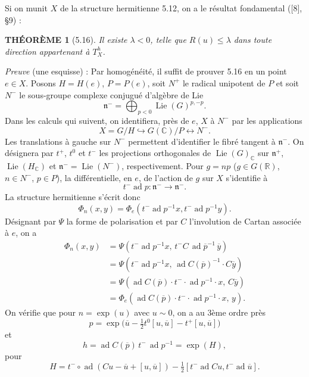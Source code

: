 \documentclass[10pt]{article}
\newcommand{\C}{\mathbb C}
\newcommand{\R}{\mathbb R}
\theoremstyle{deligne}
\newtheorem*{theoreme}{THÉORÈME}
\newcommand{\Lie}{\operatorname{Lie}}
\newcommand{\ad}{\operatorname{ad}}
\begin{document}
Si on munit $X$ de la structure hermitienne 5.12, on a le résultat fondamental ([8], §9) :

\begin{theoreme}[5.16]
Il existe $\lambda<0$, telle que $R(u)\le\lambda$ dans toute direction appartenant à $T_X^h$.
\end{theoreme}

\emph{Preuve} (une esquisse) : Par homogénéité, il suffit de prouver 5.16 en un point $e\in X$. Posons $H=H(e)$, $P=P(e)$, soit $N^+$ le radical unipotent de $P$ et soit $N^-$ le sous-groupe complexe conjugué d'algèbre de Lie
\[
  \mathfrak n^-=\bigoplus_{p<0}\Lie(G)^{p,-p}.
\]
Dans les calculs qui suivent, on identifiera, près de $e$, $X$ à $N^-$ par les applications
\[
  X=G/H \hookrightarrow G(\C)/P \longleftrightarrow N^-.
\]
Les translations à gauche sur $N^-$ permettent d'identifier le fibré tangent à $\mathfrak n^-$. On désignera par $t^+$, $t^0$ et $t^-$ les projections orthogonales de $\Lie(G)_\C$ sur $\mathfrak n^+$, $\Lie(H_\C)$ et $\mathfrak n^-=\Lie(N^-)$, respectivement. Pour $g=np$ ($g\in G(\R)$, $n\in N^-$, $p\in P$), la différentielle, en $e$, de l'action de $g$ sur $X$ s'identifie à
\[
  t^-\ad p:\mathfrak n^-\longrightarrow \mathfrak n^-.
\]
La structure hermitienne s'écrit donc
\[
  \Phi_n(x,y)=\Phi_e(t^-\ad p^{-1}x,t^-\ad p^{-1}y).
\]
Désignant par $\Psi$ la forme de polarisation et par $C$ l'involution de Cartan associée à $e$, on a
\[
\begin{aligned}
 \Phi_n(x,y)
 &=\Psi(t^-\ad p^{-1}x,\,t^- C\,\ad \overline{p}^{-1}\,\overline y)\\
 &=\Psi(t^-\ad p^{-1}x,\,\ad C(\overline p)^{-1}\cdot C\overline y)\\
 &=\Psi(\ad C(\overline p)\cdot t^-\cdot\ad p^{-1}\cdot x,\,C\overline y)\\
 &=\Phi_e(\ad C(\overline p)\cdot t^-\cdot\ad p^{-1}\cdot x,\,y).
\end{aligned}
\]
On vérifie que pour $n=\exp(u)$ avec $u\sim0$, on a au 3ème ordre près
\[
  p=\exp\bigl(\overline u-\tfrac12t^0[u,\overline u]-t^+[u,\overline u]\bigr)
\]
et
\[
  h=\ad C(\overline p)\,t^-\,\ad p^{-1}=\exp(H),
\]
pour
\[
  H=t^-\circ\ad(Cu-\overline u+[u,\overline u])
  -\tfrac12[t^-\ad Cu,t^-\ad\overline u].
\]
\end{document}
